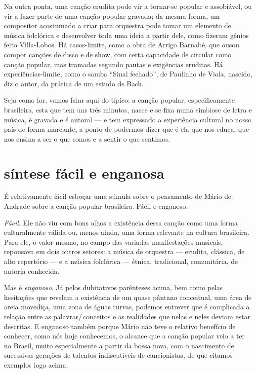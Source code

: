 Na outra ponta, uma canção erudita pode vir a tornar-se popular e
assobiável, ou vir a fazer parte de uma canção popular gravada; da mesma
forma, um compositor acostumado a criar para orquestra pode tomar um
elemento de música folclórica e desenvolver toda uma ideia a partir
dele, como fizeram gênios feito Villa-Lobos. Há casos-limite, como a
obra de Arrigo Barnabé, que ousou compor canções de disco e de show, com
certa capacidade de circular como canção popular, mas tramadas segundo
pautas e exigências eruditas. Há experiências-limite, como o samba
``Sinal fechado'', de Paulinho de Viola, nascido, diz o autor, da
prática de um estudo de Bach.

Seja como for, vamos falar aqui do típico: a canção popular,
especificamente brasileira, esta que tem uns três minutos, nasce e se
fixa numa simbiose de letra e música, é gravada e é autoral --- e tem
expressado a experiência cultural no nosso país de forma marcante, a
ponto de podermos dizer que é ela que nos educa, que nos ensina a ser o
que somos e a sentir o que sentimos.

\section{síntese fácil e enganosa}

É relativamente fácil esboçar uma súmula sobre o
pensamento de Mário de Andrade sobre a canção popular brasileira. Fácil
e enganoso.

\textit{Fácil}. Ele não viu com bons olhos a existência dessa canção como uma
forma culturalmente válida ou, menos ainda, uma forma relevante na
cultura brasileira. Para ele, o valor mesmo, no campo das variadas
manifestações musicais, repousava em dois outros setores: a música de
orquestra --- erudita, clássica, de alto repertório --- e a música folclórica --- étnica, tradicional, comunitária, de autoria conhecida.

Mas é \textit{enganoso}. Já pelos dubitativos parênteses acima, bem como pelas
hesitações que revelam a existência de um quase pântano conceitual, uma
área de areia movediça, uma zona de águas turvas, podemos entrever que é
complicada a relação entre as palavras/\,conceitos e as realidades que
nelas e neles deviam estar descritas. E enganoso também porque Mário não
teve o relativo benefício de conhecer, como nós hoje conhecemos, o
alcance que a canção popular veio a ter no Brasil, muito especialmente a
partir da bossa nova, com o nascimento de sucessivas gerações de
talentos indiscutíveis de cancionistas, de que citamos exemplos logo
acima.

